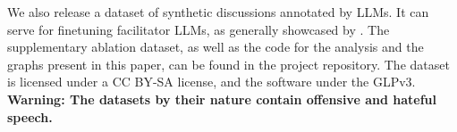 %

We also release \vmd\datasetlink a dataset of synthetic discussions annotated by \acp{LLM}. It can serve for finetuning facilitator \acp{LLM}, as generally showcased by \citet{ulmer2024}. The supplementary ablation dataset, as well as the code for the analysis and the graphs present in this paper, can be found in the project repository\analysislink. The dataset is licensed under a CC BY-SA license, and the software under the \ac{GLP}v3. \textbf{Warning: The datasets by their nature contain offensive and hateful speech.}